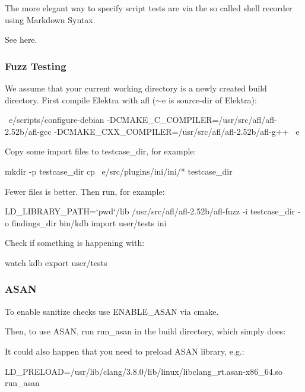 The more elegant way to specify script tests are via the so called shell recorder using Markdown Syntax.

See here.

\subsubsection*{Fuzz Testing}

We assume that your current working directory is a newly created build directory. First compile Elektra with afl ($\sim$e is source-\/dir of Elektra)\+: \begin{DoxyVerb}~e/scripts/configure-debian -DCMAKE_C_COMPILER=/usr/src/afl/afl-2.52b/afl-gcc -DCMAKE_CXX_COMPILER=/usr/src/afl/afl-2.52b/afl-g++ ~e
\end{DoxyVerb}


Copy some import files to {\ttfamily testcase\+\_\+dir}, for example\+: \begin{DoxyVerb}mkdir -p testcase_dir
cp ~e/src/plugins/ini/ini/* testcase_dir
\end{DoxyVerb}


Fewer files is better. Then run, for example\+: \begin{DoxyVerb}LD_LIBRARY_PATH=`pwd`/lib /usr/src/afl/afl-2.52b/afl-fuzz -i testcase_dir -o findings_dir bin/kdb import user/tests ini
\end{DoxyVerb}


Check if something is happening with\+: \begin{DoxyVerb}watch kdb export user/tests
\end{DoxyVerb}


\subsubsection*{A\+S\+AN}

To enable sanitize checks use {\ttfamily E\+N\+A\+B\+L\+E\+\_\+\+A\+S\+AN} via cmake.

Then, to use A\+S\+AN, run {\ttfamily run\+\_\+asan} in the build directory, which simply does\+: 


It could also happen that you need to preload A\+S\+AN library, e.\+g.\+: \begin{DoxyVerb}    LD_PRELOAD=/usr/lib/clang/3.8.0/lib/linux/libclang_rt.asan-x86_64.so run_asan
\end{DoxyVerb}


